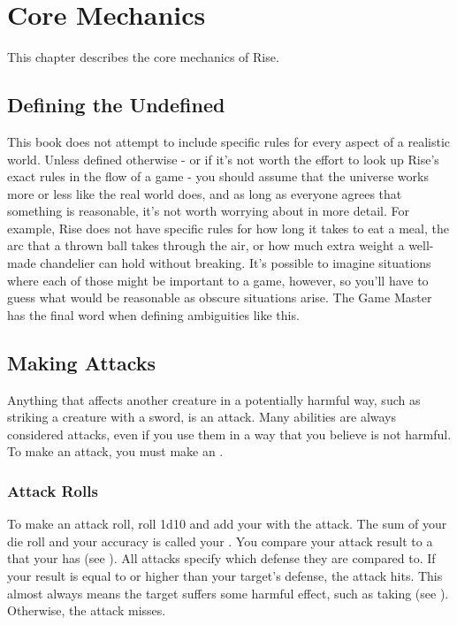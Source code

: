 \chapter{Core Mechanics}

This chapter describes the core mechanics of Rise.

\section{Defining the Undefined}
    This book does not attempt to include specific rules for every aspect of a realistic world.
    Unless defined otherwise - or if it's not worth the effort to look up Rise's exact rules in the flow of a game - you should assume that the universe works more or less like the real world does, and as long as everyone agrees that something is reasonable, it's not worth worrying about in more detail.
    For example, Rise does not have specific rules for how long it takes to eat a meal, the arc that a thrown ball takes through the air, or how much extra weight a well-made chandelier can hold without breaking.
    It's possible to imagine situations where each of those might be important to a game, however, so you'll have to guess what would be reasonable as obscure situations arise.
    The Game Master has the final word when defining ambiguities like this.

\section{Making Attacks}\label{Attacks}
    Anything that affects another creature in a potentially harmful way, such as striking a creature with a sword, is an attack.
    Many abilities are always considered attacks, even if you use them in a way that you believe is not harmful.
    To make an attack, you must make an .

    \subsection{Attack Rolls}\label{Attack Rolls}
        To make an attack roll, roll 1d10 and add your  with the attack.
        The sum of your die roll and your accuracy is called your .
        You compare your attack result to a  that your  has (see ).
        All attacks specify which defense they are compared to.
        If your result is equal to or higher than your target's defense, the attack hits.
        This almost always means the target suffers some harmful effect, such as taking  (see ).
        Otherwise, the attack misses.

